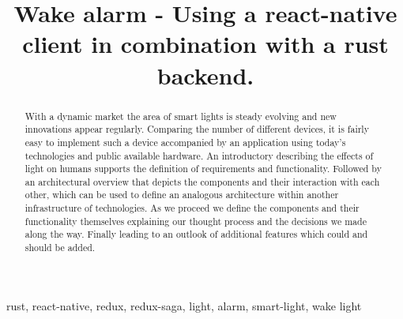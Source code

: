 \documentclass[conference]{IEEEtran}
\begin{document}
\title{Wake alarm - Using a react-native client in combination with a rust backend.}

\author{
\and
{}
}

\maketitle

\begin{abstract}
With a dynamic market the area of smart lights is steady evolving and new innovations appear regularly. Comparing the number of
different devices, it is fairly easy to implement such a device accompanied by an application using today's technologies
and public available hardware. An introductory describing the effects of light on humans supports the definition of requirements
and functionality. Followed by an architectural overview that depicts the components and their interaction with each other, which
can be used to define an analogous architecture within another infrastructure of technologies. As we proceed we define the
components and their functionality themselves explaining our thought process and the decisions we made along the way.
Finally leading to an outlook of additional features which could and should be added.

\end{abstract}

\begin{IEEEkeywords}
rust, react-native, redux, redux-saga, light, alarm, smart-light, wake light
\end{IEEEkeywords}

\end{document}
